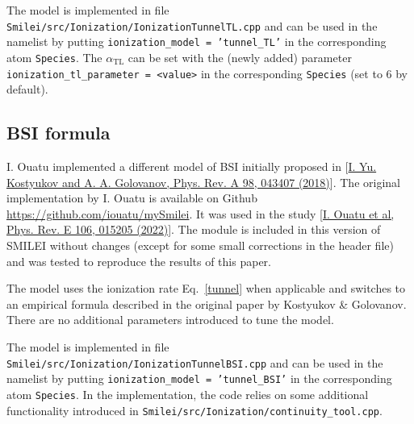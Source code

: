 \documentclass[prd, preprint,
aps,
amsmath,
amssymb,
onecolumn,
nofootinbib,
superscriptaddress,
]{revtex4-2}
\begin{document}
	The model is implemented in file \texttt{Smilei/src/Ionization/IonizationTunnelTL.cpp} and can be used in the namelist by putting \texttt{ionization\_model = 'tunnel\_TL'} in the corresponding atom \texttt{Species}. The $\alpha_{\text{TL}}$ can be set with the (newly added) parameter \texttt{ionization\_tl\_parameter = <value>} in the corresponding \texttt{Species}
	(set to 6 by default).
	
	
	
	\clearpage
	\subsection{BSI formula}
	I. Ouatu implemented a different model of BSI initially proposed in [\href{https://journals.aps.org/pra/abstract/10.1103/PhysRevA.98.043407}{I. Yu. Kostyukov and A. A. Golovanov, Phys. Rev. A 98, 043407 (2018)}]. The original implementation by I. Ouatu is available on Github \url{https://github.com/iouatu/mySmilei}. It was used in the study [\href{https://journals.aps.org/pre/abstract/10.1103/PhysRevE.106.015205}{I. Ouatu et al,
		Phys. Rev. E 106, 015205 (2022)}]. The module is included in this version of SMILEI without changes (except for some small corrections in the header file) and was tested to reproduce the results of this paper.
	
	The model uses the ionization rate Eq.~\eqref{tunnel} when applicable and switches to an empirical formula described in the original paper by Kostyukov \& Golovanov. There are no additional parameters introduced to tune the model. 
	
	The model is implemented in file \texttt{Smilei/src/Ionization/IonizationTunnelBSI.cpp} and can be used in the namelist by putting \texttt{ionization\_model = 'tunnel\_BSI'} in the corresponding atom \texttt{Species}. In the implementation, the code relies on some additional functionality introduced in \texttt{Smilei/src/Ionization/continuity\_tool.cpp}.
	
	
\end{document}
